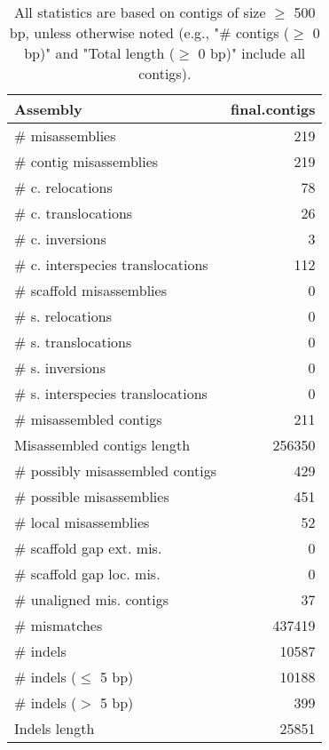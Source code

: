 \documentclass[12pt,a4paper]{article}
\begin{document}
\begin{table}[ht]
\begin{center}
\caption{All statistics are based on contigs of size $\geq$ 500 bp, unless otherwise noted (e.g., "\# contigs ($\geq$ 0 bp)" and "Total length ($\geq$ 0 bp)" include all contigs).}
\begin{tabular}{|l*{1}{|r}|}
\hline
Assembly & final.contigs \\ \hline
\# misassemblies & 219 \\ \hline
\hspace{2mm}\# contig misassemblies & 219 \\ \hline
\hspace{5mm}\# c. relocations & 78 \\ \hline
\hspace{5mm}\# c. translocations & 26 \\ \hline
\hspace{5mm}\# c. inversions & 3 \\ \hline
\hspace{5mm}\# c. interspecies translocations & 112 \\ \hline
\hspace{2mm}\# scaffold misassemblies & 0 \\ \hline
\hspace{5mm}\# s. relocations & 0 \\ \hline
\hspace{5mm}\# s. translocations & 0 \\ \hline
\hspace{5mm}\# s. inversions & 0 \\ \hline
\hspace{5mm}\# s. interspecies translocations & 0 \\ \hline
\# misassembled contigs & 211 \\ \hline
Misassembled contigs length & 256350 \\ \hline
\# possibly misassembled contigs & 429 \\ \hline
\hspace{5mm}\# possible misassemblies & 451 \\ \hline
\# local misassemblies & 52 \\ \hline
\# scaffold gap ext. mis. & 0 \\ \hline
\# scaffold gap loc. mis. & 0 \\ \hline
\# unaligned mis. contigs & 37 \\ \hline
\# mismatches & 437419 \\ \hline
\# indels & 10587 \\ \hline
\hspace{5mm}\# indels ($\leq$ 5 bp) & 10188 \\ \hline
\hspace{5mm}\# indels ($>$ 5 bp) & 399 \\ \hline
Indels length & 25851 \\ \hline
\end{tabular}
\end{center}
\end{table}
\end{document}
